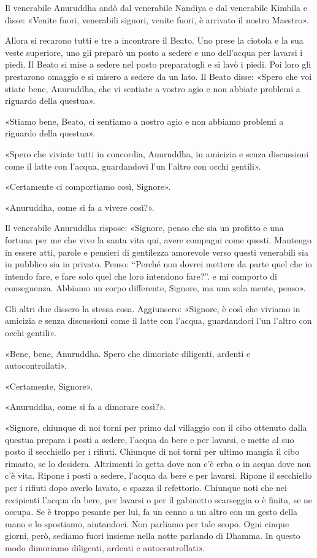 Il venerabile Anuruddha andò dal venerabile Nandiya e dal venerabile Kimbila e
disse: «Venite fuori, venerabili signori, venite fuori, è arrivato il nostro
Maestro».

Allora si recarono tutti e tre a incontrare il Beato. Uno prese la ciotola e la
sua veste superiore, uno gli preparò un posto a sedere e uno dell’acqua per
lavarsi i piedi. Il Beato si mise a sedere nel posto preparatogli e si lavò i
piedi. Poi loro gli prestarono omaggio e si misero a sedere da un lato. Il Beato
disse: «Spero che voi stiate bene, Anuruddha, che vi sentiate a vostro agio e
non abbiate problemi a riguardo della questua».

«Stiamo bene, Beato, ci sentiamo a nostro agio e non abbiamo problemi a riguardo
della questua».

«Spero che viviate tutti in concordia, Anuruddha, in amicizia e senza
discussioni come il latte con l’acqua, guardandovi l’un l’altro con occhi
gentili».

«Certamente ci comportiamo così, Signore».

«Anuruddha, come si fa a vivere così?».

Il venerabile Anuruddha rispose: «Signore, penso che sia un profitto e una
fortuna per me che vivo la santa vita qui, avere compagni come questi. Mantengo
in essere atti, parole e pensieri di gentilezza amorevole verso questi
venerabili sia in pubblico sia in privato. Penso: “Perché non dovrei mettere da
parte quel che io intendo fare, e fare solo quel che loro intendono fare?”. e mi
comporto di conseguenza. Abbiamo un corpo differente, Signore, ma una sola
mente, penso».

Gli altri due dissero la stessa cosa. Aggiunsero: «Signore, è così che viviamo
in amicizia e senza discussioni come il latte con l’acqua, guardandoci l’un
l’altro con occhi gentili».

«Bene, bene, Anuruddha. Spero che dimoriate diligenti, ardenti e
autocontrollati».

«Certamente, Signore».

«Anuruddha, come si fa a dimorare così?».

«Signore, chiunque di noi torni per primo dal villaggio con il cibo ottenuto
dalla questua prepara i posti a sedere, l’acqua da bere e per lavarsi, e mette
al suo posto il secchiello per i rifiuti. Chiunque di noi torni per ultimo
mangia il cibo rimasto, se lo desidera. Altrimenti lo getta dove non c’è erba o
in acqua dove non c’è vita. Ripone i posti a sedere, l’acqua da bere e per
lavarsi. Ripone il secchiello per i rifiuti dopo averlo lavato, e spazza il
refettorio. Chiunque noti che nei recipienti l’acqua da bere, per lavarsi o per
il gabinetto scarseggia o è finita, se ne occupa. Se è troppo pesante per lui,
fa un cenno a un altro con un gesto della mano e lo spostiamo, aiutandoci. Non
parliamo per tale scopo. Ogni cinque giorni, però, sediamo fuori insieme nella
notte parlando di Dhamma. In questo modo dimoriamo diligenti, ardenti e
autocontrollati».

